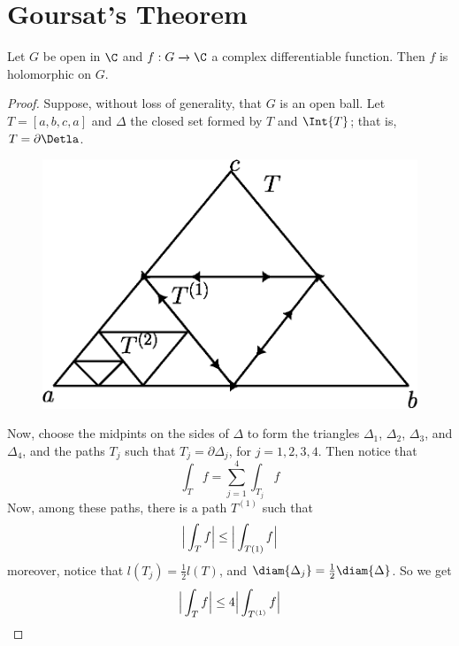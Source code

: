 \section{Goursat's Theorem}

\begin{theorem}\label{4.8.1}
    Let $G$ be open in  $\C$ and  $f:G \xrightarrow{} \C$ a complex
    differentiable function. Then $f$ is holomorphic on $G$.
\end{theorem}
\begin{proof}
    Suppose, without loss of generality, that $G$ is an open ball. Let
    $T=[a,b,c,a]$ and $\Delta$ the closed set formed by $T$ and $\Int{T}$; that
    is, $T=\partial{\Detla}$.

    \begin{figure}[h]
        \centering
        \includegraphics[scale=0.5]{Figures/chapter4/goursat_triangle.eps}
        \caption{}
        \label{figure_4.5}
    \end{figure}

    Now, choose the midpints on the sides of $\Delta$ to form the triangles
    $\Delta_1$, $\Delta_2$, $\Delta_3$, and $\Delta_4$, and the paths $T_j$ such
    that  $T_j=\partial{\Delta_j}$, for $j=1,2,3,4$. Then notice that
    \begin{equation*}
        \int_T{f}=\sum_{j=1}^4{\int_{T_j}{f}}
    \end{equation*}
    Now, among these paths, there is a path $T^{(1)}$ such that
    \begin{equation*}
        \Big{|} \int_T{f} \Big{|} \leq \Big{|} \int_{T(1)}{f} \Big{|}
    \end{equation*}
    moreover, notice that $l(T_j)=\frac{1}{2}l(T)$, and
    $\diam{\Delta_j}=\frac{1}{2}\diam{\Delta}$. So we get
    \begin{equation*}
        \Big{|} \int_T{f} \Big{|} \leq 4\Big{|} \int_{T^{(1)}}{f} \Big{|}
    \end{equation*}


\end{proof}
